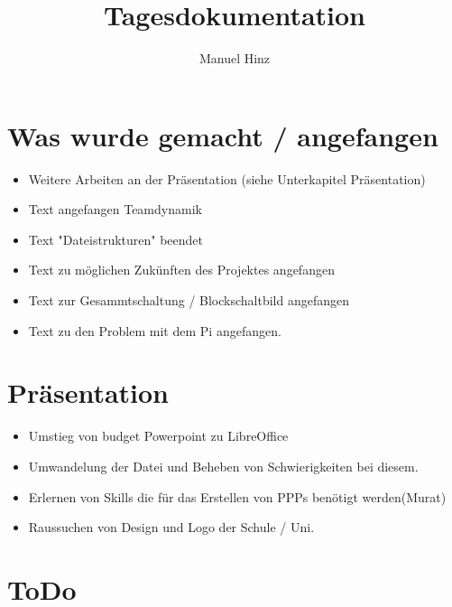 \documentclass{article}
\author{Manuel Hinz}
\title{Tagesdokumentation}
\begin{document}
\maketitle

\section{Was wurde gemacht / angefangen}

\begin{itemize}

\item Weitere Arbeiten an der Pr\"{a}sentation (siehe Unterkapitel Pr\"{a}sentation)

\item Text angefangen Teamdynamik

\item Text "Dateistrukturen" beendet

\item Text zu m\"{o}glichen Zuk\"{u}nften des Projektes angefangen

\item Text zur Gesammtschaltung / Blockschaltbild angefangen

\item Text zu den Problem mit dem Pi angefangen.

\end{itemize}

\section{Pr\"{a}sentation}

\begin{itemize}

\item Umstieg von budget Powerpoint zu LibreOffice

\item Umwandelung der Datei und Beheben von Schwierigkeiten bei diesem.

\item Erlernen von Skills die f\"{u}r das Erstellen von PPPs ben\"{o}tigt werden(Murat)

\item Raussuchen von Design und Logo der Schule / Uni.

\end{itemize}

\section{ToDo}
\end{document}
